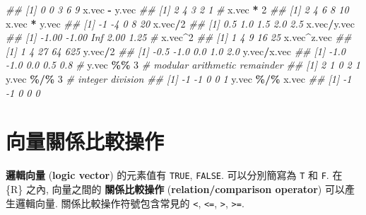 \documentclass[
]{book}
\newenvironment{Shaded}{\begin{snugshade}}{\end{snugshade}}
\newcommand{\CommentTok}[1]{\textcolor[rgb]{0.56,0.35,0.01}{\textit{#1}}}
\newcommand{\DecValTok}[1]{\textcolor[rgb]{0.00,0.00,0.81}{#1}}
\newcommand{\NormalTok}[1]{#1}
\newcommand{\OperatorTok}[1]{\textcolor[rgb]{0.81,0.36,0.00}{\textbf{#1}}}
\newcommand{\StringTok}[1]{\textcolor[rgb]{0.31,0.60,0.02}{#1}}
\begin{document}
\begin{Shaded}
\begin{Highlighting}[]
\CommentTok{\#\# [1] 0 0 3 6 9}
\NormalTok{x.vec }\OperatorTok{{-}}\StringTok{ }\NormalTok{y.vec}
\CommentTok{\#\# [1] 2 4 3 2 1}
\CommentTok{\#}
\NormalTok{x.vec }\OperatorTok{*}\StringTok{ }\DecValTok{2}
\CommentTok{\#\# [1]  2  4  6  8 10}
\NormalTok{x.vec }\OperatorTok{*}\StringTok{ }\NormalTok{y.vec}
\CommentTok{\#\# [1] {-}1 {-}4  0  8 20}
\NormalTok{x.vec}\OperatorTok{/}\DecValTok{2}
\CommentTok{\#\# [1] 0.5 1.0 1.5 2.0 2.5}
\NormalTok{x.vec}\OperatorTok{/}\NormalTok{y.vec}
\CommentTok{\#\# [1] {-}1.00 {-}1.00   Inf  2.00  1.25}
\CommentTok{\#}
\NormalTok{x.vec}\OperatorTok{\^{}}\DecValTok{2}
\CommentTok{\#\# [1]  1  4  9 16 25}
\NormalTok{x.vec}\OperatorTok{\^{}}\NormalTok{z.vec}
\CommentTok{\#\# [1]   1   4  27  64 625}
\NormalTok{y.vec}\OperatorTok{/}\DecValTok{2}
\CommentTok{\#\# [1] {-}0.5 {-}1.0  0.0  1.0  2.0}
\NormalTok{y.vec}\OperatorTok{/}\NormalTok{x.vec}
\CommentTok{\#\# [1] {-}1.0 {-}1.0  0.0  0.5  0.8}
\CommentTok{\#}
\NormalTok{y.vec }\OperatorTok{\%\%}\StringTok{ }\DecValTok{3}  \CommentTok{\# modular arithmetic remainder}
\CommentTok{\#\# [1] 2 1 0 2 1}
\NormalTok{y.vec }\OperatorTok{\%/\%}\StringTok{ }\DecValTok{3}   \CommentTok{\# integer division}
\CommentTok{\#\# [1] {-}1 {-}1  0  0  1}
\NormalTok{y.vec }\OperatorTok{\%/\%}\StringTok{ }\NormalTok{x.vec}
\CommentTok{\#\# [1] {-}1 {-}1  0  0  0}
\end{Highlighting}
\end{Shaded}

\hypertarget{ux5411ux91cfux95dcux4fc2ux6bd4ux8f03ux64cdux4f5c}{%
\section{向量關係比較操作}\label{ux5411ux91cfux95dcux4fc2ux6bd4ux8f03ux64cdux4f5c}}

\textbf{邏輯向量}
(\textbf{logic vector})
的元素值有
\texttt{TRUE},
\texttt{FALSE}.
可以分別簡寫為
\texttt{T} 和
\texttt{F}.
在 \{R\} 之內, 向量之間的
\textbf{關係比較操作}
(\textbf{relation/comparison operator})
可以產生邏輯向量.
關係比較操作符號包含常見的
\texttt{\textless{}},
\texttt{\textless{}=},
\texttt{\textgreater{}},
\texttt{\textgreater{}=}.
\end{document}
